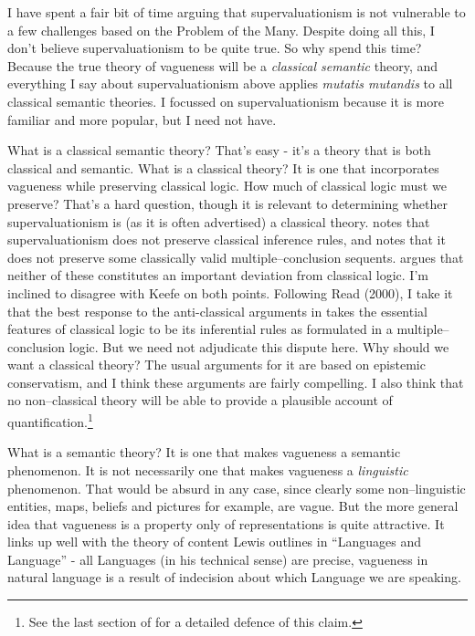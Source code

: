 I have spent a fair bit of time arguing that supervaluationism is not vulnerable to a few challenges based on the Problem of the Many. Despite doing all this, I don't believe supervaluationism to be quite true. So why spend this time? Because the true theory of vagueness will be a \textit{classical semantic} theory, and everything I say about supervaluationism above applies \textit{mutatis mutandis} to all classical semantic theories. I focussed on supervaluationism because it is more familiar and more popular, but I need not have.

What is a classical semantic theory? That's easy - it's a theory that is both classical and semantic. What is a classical theory? It is one that incorporates vagueness while preserving classical logic. How much of classical logic must we preserve? That's a hard question, though it is relevant to determining whether supervaluationism is (as it is often advertised) a classical theory. \citet{Williamson1994-WILV} notes that supervaluationism does not preserve classical inference rules, and \citet{Hyde1997} notes that it does not preserve some classically valid multiple--conclusion sequents. \citet{Keefe2000} argues that neither of these constitutes an important deviation from classical logic. I'm inclined to disagree with Keefe on both points. Following Read (2000), I take it that the best response to the anti-classical arguments in \citet{Dummett1991}takes the essential features of classical logic to be its inferential rules as formulated in a multiple--conclusion logic. But we need not adjudicate this dispute here. Why should we want a classical theory? The usual arguments for it are based on epistemic conservatism, and I think these arguments are fairly compelling. I also think that no non--classical theory will be able to provide a plausible account of quantification.\footnote{See the last section of \citet{Weatherson2005-WEATTT} for a detailed defence of this claim.}

What is a semantic theory? It is one that makes vagueness a semantic phenomenon. It is not necessarily one that makes vagueness a \textit{linguistic} phenomenon. That would be absurd in any case, since clearly some non--linguistic entities, maps, beliefs and pictures for example, are vague. But the more general idea that vagueness is a property only of representations is quite attractive. It links up well with the theory of content Lewis outlines in ``Languages and Language'' - all Languages (in his technical sense) are precise, vagueness in natural language is a result of indecision about which Language we are speaking.

